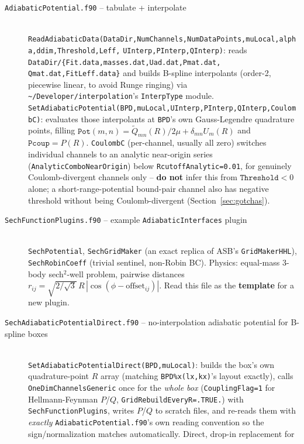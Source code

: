 \documentclass[11pt]{article}
\newcommand{\file}[1]{\texttt{#1}}
\newcommand{\sub}[1]{\texttt{#1}}
\begin{document}
\begin{description}
\item[\file{AdiabaticPotential.f90} -- tabulate + interpolate] \hfill \\
  \sub{ReadAdiabaticData(DataDir,NumChannels,NumDataPoints,muLocal,alpha,ddim,Threshold,Leff,}
  \sub{UInterp,PInterp,QInterp)}: reads \texttt{DataDir/\{Fit.data,masses.dat,Uad.dat,Pmat.dat,}
  \texttt{Qmat.dat,FitLeff.data\}} and builds B-spline interpolants (order-2, piecewise linear, to
  avoid Runge ringing) via \texttt{\textasciitilde/Developer/interpolation}'s
  \texttt{InterpType} module. \\
  \sub{SetAdiabaticPotential(BPD,muLocal,UInterp,PInterp,QInterp,CoulombC)}: evaluates those
  interpolants at \texttt{BPD}'s own Gauss-Legendre quadrature points, filling
  $\texttt{Pot}(m,n)=\tilde Q_{mn}(R)/2\mu+\delta_{mn}U_m(R)$ and $\texttt{Pcoup}=P(R)$.
  \texttt{CoulombC} (per-channel, usually all zero) switches individual channels to an analytic
  near-origin series (\sub{AnalyticComboNearOrigin}) below \texttt{RcutoffAnalytic=0.01}, for
  genuinely Coulomb-divergent channels only -- \textbf{do not} infer this from
  $\texttt{Threshold}<0$ alone; a short-range-potential bound-pair channel also has negative
  threshold without being Coulomb-divergent (Section~\ref{sec:gotchas}).
\item[\file{SechFunctionPlugins.f90} -- example \texttt{AdiabaticInterfaces} plugin] \hfill \\
  \sub{SechPotential}, \sub{SechGridMaker} (an exact replica of ASB's \sub{GridMakerHHL}),
  \sub{SechRobinCoeff} (trivial sentinel, non-Robin BC). Physics: equal-mass 3-body sech$^2$-well
  problem, pairwise distances $r_{ij}=\sqrt{2/\sqrt3}\,R\,|\cos(\phi-\text{offset}_{ij})|$. Read
  this file as the \textbf{template} for a new plugin.
\item[\file{SechAdiabaticPotentialDirect.f90} -- no-interpolation adiabatic potential for
  B-spline boxes] \hfill \\
  \sub{SetAdiabaticPotentialDirect(BPD,muLocal)}: builds the box's own quadrature-point $R$ array
  (matching \texttt{BPD\%x(lx,kx)}'s layout exactly), calls \sub{OneDimChannelsGeneric} once for
  the \emph{whole box} (\texttt{CouplingFlag=1} for Hellmann-Feynman $P$/$Q$,
  \texttt{GridRebuildEveryR=.TRUE.}) with \file{SechFunctionPlugins}, writes $P$/$Q$ to scratch
  files, and re-reads them with \emph{exactly} \file{AdiabaticPotential.f90}'s own reading
  convention so the sign/normalization matches automatically. Direct, drop-in replacement for

\end{description}
\end{document}
